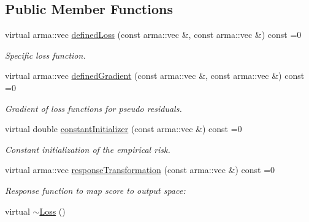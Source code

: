 \subsection*{Public Member Functions}
\begin{DoxyCompactItemize}
\item 
virtual arma\+::vec \hyperlink{classloss_1_1_loss_ae9f94dd9b8311397583ba3a9cb485e94}{defined\+Loss} (const arma\+::vec \&, const arma\+::vec \&) const =0
\begin{DoxyCompactList}\small\item\em Specific loss function. \end{DoxyCompactList}\item 
virtual arma\+::vec \hyperlink{classloss_1_1_loss_a267a4de70747ade4b2d84ce35a448979}{defined\+Gradient} (const arma\+::vec \&, const arma\+::vec \&) const =0
\begin{DoxyCompactList}\small\item\em Gradient of loss functions for pseudo residuals. \end{DoxyCompactList}\item 
virtual double \hyperlink{classloss_1_1_loss_a65fe7dcd9370e6a549b8d1cc95fc8798}{constant\+Initializer} (const arma\+::vec \&) const =0
\begin{DoxyCompactList}\small\item\em Constant initialization of the empirical risk. \end{DoxyCompactList}\item 
virtual arma\+::vec \hyperlink{classloss_1_1_loss_a0a84b7df79b08e40b538aaa7e6ee75c4}{response\+Transformation} (const arma\+::vec \&) const =0
\begin{DoxyCompactList}\small\item\em Response function to map score to output space\+: \end{DoxyCompactList}\item 
virtual \hyperlink{classloss_1_1_loss_a868a7908fd97590b6c4fc69f4eb3c570}{$\sim$\+Loss} ()
\end{DoxyCompactItemize}
